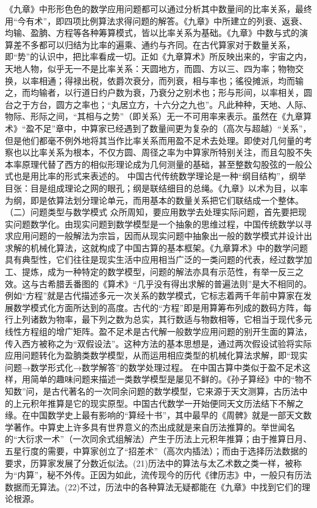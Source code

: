 \documentclass[12pt,UTF8]{ctexbook}
\begin{document}
《九章》中形形色色的数学应用问题都可以通过分析其中数量间的比率关系，最终用“今有术”，即四项比例算法求得问题的解答。《九章》中所建立的列衰、返衰、均输、盈朒、方程等各种筹算模式，皆以比率关系为基础。《九章》中数与式的演算差不多都可以归结为比率的遍乘、通约与齐同。在古代算家对于数量关系，即“势”的认识中，把比率看成一切。正如《九章算术》所反映出来的，宇宙之内，天地人物，似乎无一不是比率关系：天圆地方，而圆、方以三、四为率；物物交换，以率相通；得禄出税，依爵次衰分，而列衰，相与率也；徭役摊派，均而输之，而均输者，以行道日约户数为衰，乃衰分之别术也；形与形间，以率相关，圆台之于方台，圆方之率也；“丸居立方，十六分之九也”。凡此种种，天地、人际、物际、形际之间，“其相与之势”（即关系）无一不可用率来表示。虽然在《九章算术》“盈不足”章中，中算家已经遇到了数量间更为复杂的（高次与超越）“关系”，但是他们都毫不例外地将其当作比率关系而用盈不足术去处理。即使对几何量的考察也以比率关系为根本，不仅方圆、周径之率为中算家所特别关注，而且勾股不失本率原理代替了西方的相似形理论成为几何测量的基础，甚至整数勾股弦的一般公式也是用比率的形式来表述的。
中国古代传统数学理论是一种“纲目结构”，纲举目张：目是组成理论之网的眼孔；纲是联结细目的总绳。《九章》以术为目，以率为纲，即是依算法划分理论单元，而用基本的数量关系把它们联结成一个整体。
（二）问题类型与数学模式
众所周知，要应用数学去处理实际问题，首先要把现实问题数学化。由现实问题到数学模型是一个抽象的思维过程，中国传统数学以寻求应用问题的一般解法为宗旨，因而从现实问题中抽象出一般的数学模式并设计出求解的机械化算法，这就构成了中国古算的基本框架。《九章算术》中的数学问题具有典型性，它们往往是现实生活中应用相当广泛的一类问题的代表，经过数学加工、提炼，成为一种特定的数学模型，问题的解法亦具有示范性，有举一反三之效。这与古希腊丢番图的《算术》“几乎没有得出求解的普遍法则”是大不相同的。
例如“方程”就是古代描述多元一次关系的数学模式，它标志着两千年前中算家在发展数学模式化方面所达到的高度。古代的“方程”即是用算筹布列成的数码方阵，每行上列诸数为物率，最下列之数为总实，其行数适与物数相等，它相当于现代多元线性方程组的增广矩阵。盈不足术是古代解一般数学应用问题的别开生面的算法，传入西方被称之为“双假设法”。这种方法的基本思想是，通过两次假设试验将实际应用问题转化为盈朒类数学模型，从而运用相应类型的机械化算法求解，即“现实问题→数学形式化→数学解答”的数学处理过程。
在中国古算中类似于盈不足术这样，用简单的趣味问题来描述一类数学模型是屡见不鲜的。《孙子算经》中的“物不知数”问，是古代著名的一次同余问题的数学模型，它来源于天文测算，古历法中的上元积年推算是它的现实原型。中国古代数学一开始便同天文历法结下不解之缘。在中国数学史上最有影响的“算经十书”，其中最早的《周髀》就是一部天文数学著作。中算史上许多具有世界意义的杰出成就是来自历法推算的。举世闻名的“大衍求一术”（一次同余式组解法）产生于历法上元积年推算；由于推算日月、五星行度的需要，中算家创立了“招差术”（高次内插法）；而由于选择历法数据的要求，历算家发展了分数近似法。(21)历法中的算法与太乙术数之类一样，被称为“内算”，秘不外传。正因为如此，流传现今的历代《律历志》中，一般只有历法数据而无算法。(22)不过，历法中的各种算法无疑都能在《九章》中找到它们的理论根源。
\end{document}

